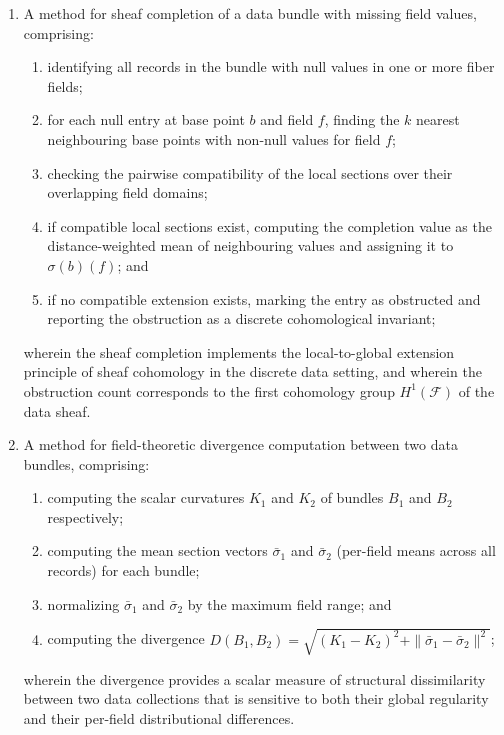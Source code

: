 \documentclass[11pt,letterpaper]{article}
\begin{document}
\begin{enumerate}
\item A method for sheaf completion of a data bundle with missing field values, comprising:
\begin{enumerate}[label=(\alph*)]
  \item identifying all records in the bundle with null values in one or more fiber fields;
  \item for each null entry at base point $b$ and field $f$, finding the $k$ nearest neighbouring base points with non-null values for field $f$;
  \item checking the pairwise compatibility of the local sections over their overlapping field domains;
  \item if compatible local sections exist, computing the completion value as the distance-weighted mean of neighbouring values and assigning it to $\sigma(b)(f)$; and
  \item if no compatible extension exists, marking the entry as obstructed and reporting the obstruction as a discrete cohomological invariant;
\end{enumerate}
wherein the sheaf completion implements the local-to-global extension principle of sheaf cohomology in the discrete data setting, and wherein the obstruction count corresponds to the first cohomology group $H^1(\mathcal{F})$ of the data sheaf.

\item A method for field-theoretic divergence computation between two data bundles, comprising:
\begin{enumerate}[label=(\alph*)]
  \item computing the scalar curvatures $K_1$ and $K_2$ of bundles $B_1$ and $B_2$ respectively;
  \item computing the mean section vectors $\bar{\sigma}_1$ and $\bar{\sigma}_2$ (per-field means across all records) for each bundle;
  \item normalizing $\bar{\sigma}_1$ and $\bar{\sigma}_2$ by the maximum field range; and
  \item computing the divergence $D(B_1, B_2) = \sqrt{(K_1 - K_2)^2 + \|\bar{\sigma}_1 - \bar{\sigma}_2\|^2}$;
\end{enumerate}
wherein the divergence provides a scalar measure of structural dissimilarity between two data collections that is sensitive to both their global regularity and their per-field distributional differences.


\end{enumerate}
\end{document}
